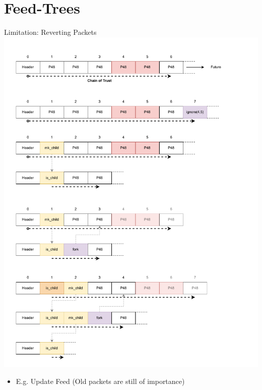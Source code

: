 \documentclass[aspectratio=169]{beamer}
\begin{document}
\section{Feed-Trees}

\begin{frame}[c]{Limitation: Reverting Packets}
        \includegraphics[width=1\textwidth]{images/fork_1.pdf}
        \begin{itemize}
        		\item E.g. Update Feed (Old packets are still of importance)
	\end{itemize}
\end{frame}
\end{document}
